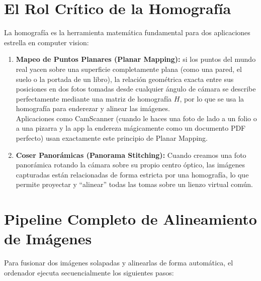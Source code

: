 \section{El Rol Crítico de la Homografía}
La homografía es la herramienta matemática fundamental para dos aplicaciones estrella en computer vision:
\begin{enumerate}
    \item \textbf{Mapeo de Puntos Planares (Planar Mapping):} si los puntos del mundo real yacen sobre una superficie completamente plana (como una pared, el suelo o la portada de un libro), la relación geométrica exacta entre sus posiciones en dos fotos tomadas desde cualquier ángulo de cámara se describe perfectamente mediante una matriz de homografía $H$, por lo que se usa la homografía para enderezar y alinear las imágenes. \\
    
    \noindent
    Aplicaciones como CamScanner (cuando le haces una foto de lado a un folio o a una pizarra y la app la endereza mágicamente como un documento PDF perfecto) usan exactamente este principio de Planar Mapping.
    \item \textbf{Coser Panorámicas (Panorama Stitching):} Cuando creamos una foto panorámica rotando la cámara sobre su propio centro óptico, las imágenes capturadas están relacionadas de forma estricta por una homografía, lo que permite proyectar y ``alinear'' todas las tomas sobre un lienzo virtual común.
\end{enumerate}


\section{Pipeline Completo de Alineamiento de Imágenes}
Para fusionar dos imágenes solapadas y alinearlas de forma automática, el ordenador ejecuta secuencialmente los siguientes pasos:

